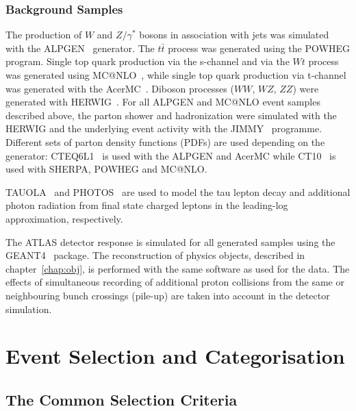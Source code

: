 \subsubsection{Background Samples}
The production of $W$ and $Z/\gamma^*$ bosons in association with jets
was simulated with the ALPGEN~\cite{Alpgen} generator. 
The $t\bar{t}$ process was generated using the POWHEG program. Single top quark 
production via the  s-channel and via the   $Wt$ process was
 generated using MC@NLO~\cite{MCatNLO}, while single top quark production via 
t-channel  was generated with the AcerMC~\cite{AcerMC}.  Diboson processes ($WW$, $WZ$, $ZZ$) were generated with
 HERWIG~\cite{Herwig}.  For all ALPGEN  
and MC@NLO event samples described
above, the parton shower and hadronization were simulated with the  HERWIG
and the underlying event activity with the JIMMY~\cite{JIMMY} programme.
Different sets of parton density functions (PDFs)  are used depending on
the generator: CTEQ6L1~\cite{CTEQ6} is used with the ALPGEN and AcerMC while
CT10~\cite{CT10} is used with SHERPA, POWHEG and MC@NLO. 

TAUOLA~\cite{TAUOLA} and PHOTOS~\cite{PHOTOS} are used to model the
tau lepton decay and additional photon radiation from final state charged leptons
in the leading-log approximation, respectively.

The ATLAS detector response is simulated for all generated samples using the GEANT4~\cite{Geant4,ATLASSIM} package.
The reconstruction of physics objects, described in chapter~\ref{chap:obj}, is performed with the same software as used for 
the data.
The effects of simultaneous recording of additional proton collisions from the
same or neighbouring bunch crossings (pile-up) are taken into account in the detector
simulation. 



\section{Event Selection and Categorisation}\label{sec:selection}


\subsection{The Common Selection Criteria}\label{sec:presel}

